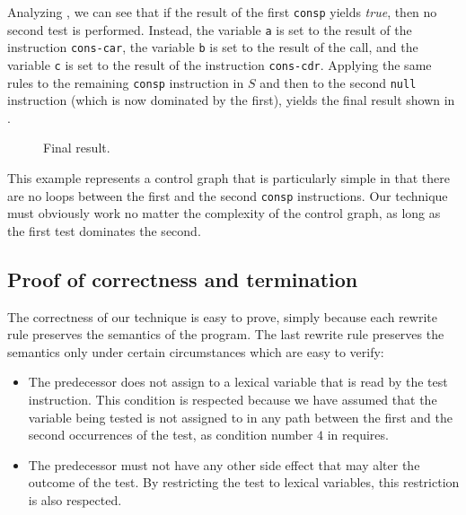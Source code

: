 Analyzing , we can see that if the result of the
first \texttt{consp} yields \emph{true}, then no second test is
performed.  Instead, the variable \texttt{a} is set to the result of
the instruction \texttt{cons-car}, the variable \texttt{b} is set to
the result of the call, and the variable \texttt{c} is set to the
result of the instruction \texttt{cons-cdr}.  Applying the same rules
to the remaining \texttt{consp} instruction in $S$ and then to the
second \texttt{null} instruction (which is now dominated by the
first), yields the final result shown in  .

\begin{figure}
\begin{center}
\end{center}
\caption{\label{fig-rewrite-8}
Final result.}
\end{figure}

This example represents a control graph that is particularly simple in
that there are no loops between the first and the second
\texttt{consp} instructions.  Our technique must obviously work no
matter the complexity of the control graph, as long as the first test
dominates the second.

\subsection{Proof of correctness and termination}

The correctness of our technique is easy to prove, simply because each
rewrite rule preserves the semantics of the program.  The last rewrite
rule preserves the semantics only under certain circumstances which
are easy to verify:

\begin{itemize}
\item The predecessor does not assign to a lexical variable that is
  read by the test instruction.  This condition is respected because
  we have assumed that the variable being tested is not assigned to
  in any path between the first and the second occurrences of the
  test, as condition number $4$ in
   requires.
\item The predecessor must not have any other side effect that may
  alter the outcome of the test.  By restricting the test to lexical
  variables, this restriction is also respected.
\end{itemize}

